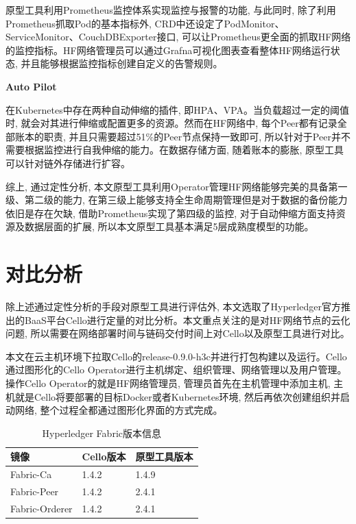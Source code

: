 原型工具利用Prometheus监控体系实现监控与报警的功能, 与此同时, 除了利用Prometheus抓取Pod的基本指标外, CRD中还设定了PodMonitor、ServiceMonitor、CouchDBExporter接口, 可以让Prometheus更全面的抓取HF网络的监控指标。HF网络管理员可以通过Grafna可视化图表查看整体HF网络运行状态, 并且能够根据监控指标创建自定义的告警规则。

\textbf{Auto Pilot}

在Kubernetes中存在两种自动伸缩的插件, 即HPA、VPA。当负载超过一定的阈值时, 就会对其进行伸缩或配置更多的资源。然而在HF网络中, 每个Peer都有记录全部账本的职责, 并且只需要超过51\%的Peer节点保持一致即可, 所以针对于Peer并不需要根据监控进行自我伸缩的能力。在数据存储方面, 随着账本的膨胀, 原型工具可以针对链外存储进行扩容。

综上, 通过定性分析, 本文原型工具利用Operator管理HF网络能够完美的具备第一级、第二级的能力, 在第三级上能够支持全生命周期管理但是对于数据的备份能力依旧是存在欠缺, 借助Prometheus实现了第四级的监控, 对于自动伸缩方面支持资源及数据层面的扩展, 所以本文原型工具基本满足5层成熟度模型的功能。

\section{对比分析} \label{section: tool_comparison}

除上述通过定性分析的手段对原型工具进行评估外, 本文选取了Hyperledger官方推出的BaaS平台Cello进行定量的对比分析。本文重点关注的是对HF网络节点的云化问题, 所以需要在网络部署时间与链码交付时间上对Cello以及原型工具进行对比。

本文在云主机环境下拉取Cello的release-0.9.0-h3c并进行打包构建以及运行。Cello通过图形化的Cello Operator进行主机绑定、组织管理、网络管理以及用户管理。操作Cello Operator的就是HF网络管理员, 管理员首先在主机管理中添加主机, 主机就是Cello将要部署的目标Docker或者Kubernetes环境, 然后再依次创建组织并启动网络, 整个过程全都通过图形化界面的方式完成。



{\footnotesize
\begin{longtable}[h]{m{100pt} m{100pt} m{100pt}}
    \caption[Hyperledger Fabric版本信息]{Hyperledger Fabric版本信息} \label{test_fabric_net} \\
        \hline  
        \textbf{镜像}&\textbf{Cello版本}&\textbf{原型工具版本}\\
        \hline
        Fabric-Ca & 1.4.2 & 1.4.9 \\
        Fabric-Peer & 1.4.2 & 2.4.1 \\
        Fabric-Orderer & 1.4.2 & 2.4.1 \\
        \hline
    \end{longtable}
}

